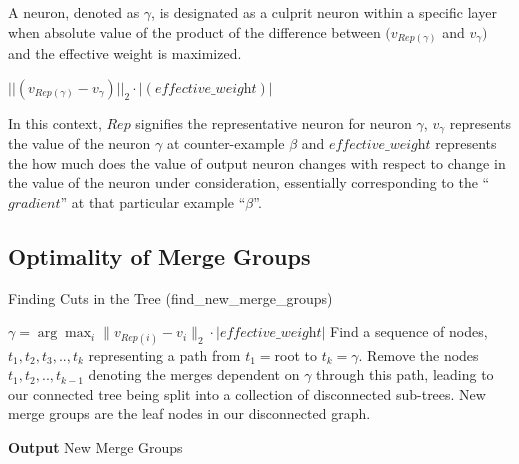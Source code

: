  A neuron, denoted as $\gamma$, is designated as a culprit neuron within a
specific layer when absolute value of the product of the difference between
$(v_{Rep(\gamma)}$ and $v_{\gamma})$ and the effective weight is maximized.

$||(v_{Rep(\gamma)} - v_{\gamma})||_{2} \cdot |(\textit{effective\_weight})|$

In this context, $Rep$ signifies the representative neuron for neuron $\gamma$,
$v_{\gamma}$ represents the value of the neuron $\gamma$ at counter-example $\beta$
and $\textit{effective\_weight}$ represents the how much does the value of output
neuron changes with respect to change in the value of the neuron under consideration,
essentially corresponding to the ``$\textit{gradient}$'' at that particular example 
``$\beta$''.

\subsection{Optimality of Merge Groups}





\begin{algorithm}
    \caption{Finding Cuts in the Tree (find\_new\_merge\_groups)}
    \begin{algorithmic}[1]
        \State $\gamma= \arg \max_i \|v_{Rep(i)} -v_i \|_2 \cdot | \textit{effective\_weight}| $ 
        \State Find a sequence of nodes, $t_1,t_2,t_3,..,t_k$ representing a  path from $t_1=$root to $t_k=\gamma$.
        \State Remove the nodes $t_1,t_2,..,t_{k-1}$ denoting the merges dependent on $\gamma$ through this path, leading to our connected tree being split into a collection of disconnected sub-trees.
        \State New merge groups are the leaf nodes in our disconnected graph.
    \end{algorithmic}
    \hspace*{\algorithmicindent} \textbf{Output} New Merge Groups
\end{algorithm}



